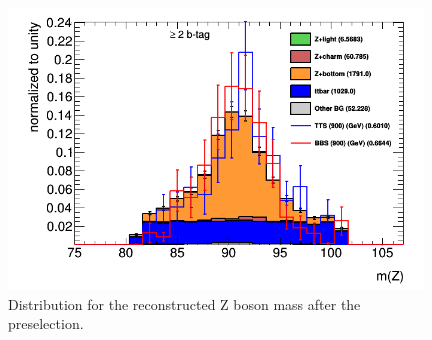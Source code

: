 \begin{figure}
\centering
\includegraphics[width=11cm]{figures/Zmass.png}
\caption{Distribution for the reconstructed Z boson mass after the preselection.}
\label{Zmass}
\end{figure}

